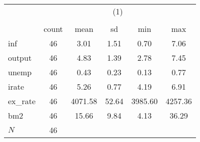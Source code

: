 {
\def\sym#1{\ifmmode^{#1}\else\(^{#1}\)\fi}
\begin{tabular}{l*{1}{ccccc}}
\hline\hline
            &\multicolumn{5}{c}{(1)}                                         \\
            &\multicolumn{5}{c}{}                                            \\
            &       count&        mean&          sd&         min&         max\\
\hline
inf         &          46&        3.01&        1.51&        0.70&        7.06\\
output      &          46&        4.83&        1.39&        2.78&        7.45\\
unemp       &          46&        0.43&        0.23&        0.13&        0.77\\
irate       &          46&        5.26&        0.77&        4.19&        6.91\\
ex\_rate     &          46&     4071.58&       52.64&     3985.60&     4257.36\\
bm2         &          46&       15.66&        9.84&        4.13&       36.29\\
\hline
\(N\)       &          46&            &            &            &            \\
\hline\hline
\end{tabular}
}
